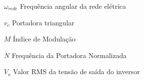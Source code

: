 \begin{simbolos}
  \item[$ \omega_{rede} $] Frequência angular da rede elétrica
  \item[$ v_c $] Portadora triangular
  \item[$ M $] Índice de Modulação
  \item[$ N $] Frequência da Portadora Normalizada
  \item[$ V_o $] Valor RMS da tensão de saída do inversor
  
\end{simbolos}
